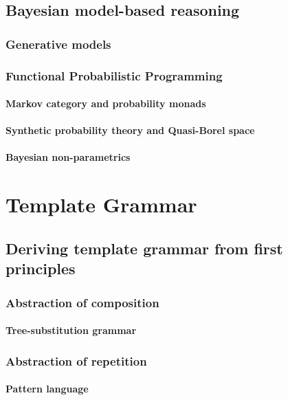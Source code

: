 \chapter{Bayesian model-based reasoning}
    \section{Generative models}
    \section{Functional Probabilistic Programming}
        \subsection{Markov category and probability monads}
        \subsection{Synthetic probability theory and Quasi-Borel space}
        \subsection{Bayesian non-parametrics}




%
\cleardoublepage
\part{Template Grammar}
\chapter{Deriving template grammar from first principles}
    \section{Abstraction of composition}
        \subsection{Tree-substitution grammar}
    \section{Abstraction of repetition}
        \subsection{Pattern language}
